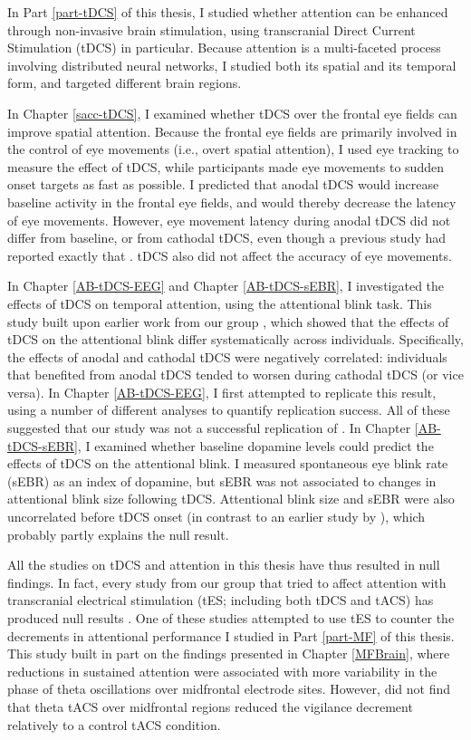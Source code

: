 \documentclass[11pt,english,]{memoir}
\begin{document}
In Part \ref{part-tDCS} of this thesis, I studied whether attention can be enhanced through non-invasive brain stimulation, using transcranial Direct Current Stimulation (tDCS) in particular. Because attention is a multi-faceted process involving distributed neural networks, I studied both its spatial and its temporal form, and targeted different brain regions.

In Chapter \ref{sacc-tDCS}, I examined whether tDCS over the frontal eye fields can improve spatial attention. Because the frontal eye fields are primarily involved in the control of eye movements (i.e., overt spatial attention), I used eye tracking to measure the effect of tDCS, while participants made eye movements to sudden onset targets as fast as possible. I predicted that anodal tDCS would increase baseline activity in the frontal eye fields, and would thereby decrease the latency of eye movements. However, eye movement latency during anodal tDCS did not differ from baseline, or from cathodal tDCS, even though a previous study had reported exactly that \autocite{Kanai2012}. tDCS also did not affect the accuracy of eye movements.

In Chapter \ref{AB-tDCS-EEG} and Chapter \ref{AB-tDCS-sEBR}, I investigated the effects of tDCS on temporal attention, using the attentional blink task. This study built upon earlier work from our group \autocite{London2015}, which showed that the effects of tDCS on the attentional blink differ systematically across individuals. Specifically, the effects of anodal and cathodal tDCS were negatively correlated: individuals that benefited from anodal tDCS tended to worsen during cathodal tDCS (or vice versa). In Chapter \ref{AB-tDCS-EEG}, I first attempted to replicate this result, using a number of different analyses to quantify replication success. All of these suggested that our study was not a successful replication of \textcite{London2015}. In Chapter \ref{AB-tDCS-sEBR}, I examined whether baseline dopamine levels could predict the effects of tDCS on the attentional blink. I measured spontaneous eye blink rate (sEBR) as an index of dopamine, but sEBR was not associated to changes in attentional blink size following tDCS. Attentional blink size and sEBR were also uncorrelated before tDCS onset (in contrast to an earlier study by \textcite{Colzato2008}), which probably partly explains the null result.

All the studies on tDCS and attention in this thesis have thus resulted in null findings. In fact, every study from our group that tried to affect attention with transcranial electrical stimulation (tES; including both tDCS and tACS) has produced null results \autocites{VanSchouwenburg2019}{VanSchouwenburg2018}. One of these studies \autocite{VanSchouwenburg2019} attempted to use tES to counter the decrements in attentional performance I studied in Part \ref{part-MF} of this thesis. This study built in part on the findings presented in Chapter \ref{MFBrain}, where reductions in sustained attention were associated with more variability in the phase of theta oscillations over midfrontal electrode sites. However, \textcite{VanSchouwenburg2019} did not find that theta tACS over midfrontal regions reduced the vigilance decrement relatively to a control tACS condition.
\end{document}
